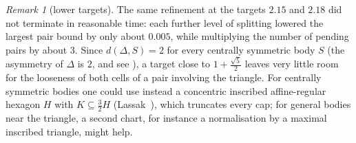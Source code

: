 \documentclass[11pt]{amsart}
\theoremstyle{definition}
\theoremstyle{remark}
\newtheorem{remark}[theorem]{Remark}
\newcommand{\dBM}{d}
\begin{document}
\begin{remark}[lower targets]
The same refinement at the targets $2.15$ and $2.18$ did not terminate in reasonable time: each further level of splitting
lowered the largest pair bound by only about $0.005$, while multiplying the number of pending pairs by about $3$. Since
$\dBM(\Delta,S)=2$ for every centrally symmetric body $S$ (the asymmetry of $\Delta$ is $2$, and see \cite{Kobos}), a target close to
$1+\frac{\sqrt5}2$ leaves very little room for the looseness of both cells of a pair involving the triangle. For centrally
symmetric bodies one could use instead a concentric inscribed affine-regular hexagon $H$ with $K\subseteq\frac32H$
(Lassak~\cite{Lassak92}), which truncates every cap; for general bodies near the triangle, a second chart, for instance a
normalisation by a maximal inscribed triangle, might help.
\end{remark}

\end{document}
